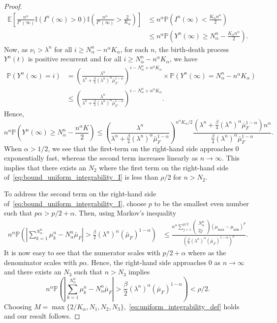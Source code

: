 \documentclass[a4paper,11pt,twoside]{article}
\numberwithin{equation}{section}
\numberwithin{figure}{section}
\theoremstyle{plain}
\newcommand{\EE}{\mathbb{E}}
\newcommand{\II}{\mathbb{I}}
\newcommand{\PP}{\mathbb{P}}
\newcommand{\1}{\mathbbm{1}}
\begin{document}
\begin{proof}
\begin{align*}
   \EE\left[\frac{n^{\alpha}}{I^n(\infty)}\II(I^n(\infty)>0)\II\left(\frac{n^{\alpha}}{I^n(\infty)}>\frac{2}{K_\alpha}\right)\right]
   & 
   \leq n^\alpha \PP\left(I^n(\infty)<\frac{K_\alpha n^{\alpha}}{2}\right)
  \\
  &
  \leq n^\alpha \PP\left(Y^n(\infty)\geq N^n_\alpha-\frac{K_\alpha n^{\alpha}}{2}\right).
\end{align*}
Now, as $\nu_i> \lambda^n$ for all $i\geq N^n_\alpha-n^{\alpha}K_\alpha$, for each $n$, the birth-death process $Y^n(t)$ is positive recurrent and for all $i\geq N^n_\alpha-n^{\alpha}K_\alpha$, we have
\begin{align*}
\PP(Y^n(\infty)=i)
&=\left(\frac{\lambda^n}{\lambda^n+\frac{\beta}{4}(\lambda^n)^{\alpha}\bar{\mu}_F^{1-\alpha}}\right)^{i-N^n_\alpha+n^\alpha K_\alpha}
\times \PP(Y^n(\infty)=N^n_\alpha-n^\alpha K_\alpha)
\\
&\leq \left(\frac{\lambda^n}{\lambda^n+\frac{\beta}{4}(\lambda^n)^{\alpha}\bar{\mu}_F^{1-\alpha}}\right)^{i-N^n_\alpha+n^\alpha K_\alpha}.
\end{align*}
Hence, 
\[
n^\alpha\PP\left(Y^n(\infty)
\geq 
N^n_\alpha-\frac{ n^\alpha K}{2}\right)
\leq \left(\frac{\lambda^n}{\lambda^n+\frac{\beta}{4}(\lambda^n)^{\alpha}\bar{\mu}_F^{1-\alpha}}\right)^{n^\alpha K_\alpha/2}\frac{(\lambda^n+\frac{\beta}{4}(\lambda^n)^{\alpha}\bar{\mu}_F^{1-\alpha})n^\alpha}{\frac{\beta}{4}(\lambda^n)^{\alpha}\bar{\mu}_F^{1-\alpha}}.
\]
When $\alpha>1/2$, we see that the first-term on the right-hand side approaches 0 exponentially fast, whereas the second term increases linearly as $n\to \infty$. This implies that there exists an $N_2$ where the first term on the right-hand side of~\eqref{eq:bound_uniform_integrability_I} is less than $\rho/2$ for $n>N_2$.

To address the second term on the right-hand side of~\eqref{eq:bound_uniform_integrability_I}, choose $p$ to be the smallest even number such that $p\alpha>p/2+\alpha$. Then, using Markov's inequality
\begin{align*}
    n^{\alpha}\PP\left(\left|\sum_{k=1}^{N^n_\alpha}\mu_k^n-N^n_\alpha\bar{\mu}_F\right|> \frac{\beta}{2}(\lambda^n)^\alpha(\bar{\mu}_F)^{1-\alpha}\right)&\leq \frac{n^\alpha \sum_{j=1}^{p/2}
    \left(\begin{array}{c}N^n_\alpha\\2j\end{array}\right)(\mu_{\max}-\mu_{\min})^p}{\left(\frac{\beta}{2}(\lambda^n)^\alpha(\bar{\mu}_F)^{1-\alpha}\right)^p}.
\end{align*}
It is now easy to see that the numerator scales with $p/2+\alpha$ where as the denominator scales with $p\alpha$. Hence, the right-hand side approaches 0 as $n\to \infty$ and there exists an $N_3$ such that  $n>N_3$ implies 
\[
n^{\alpha}\PP\left(\left|\sum_{k=1}^{N^n_\alpha}\mu_k^n-N^n_\alpha\bar{\mu}_F\right|> \frac{\beta}{2}(\lambda^n)^\alpha(\bar{\mu}_F)^{1-\alpha}\right)<\rho/2.
\]
 Choosing $M=\max\{2/K_\alpha, N_1, N_2, N_3\}$,~\eqref{eq:uniform_integrability_def} holds and our result follows. \end{proof}
\end{document}
